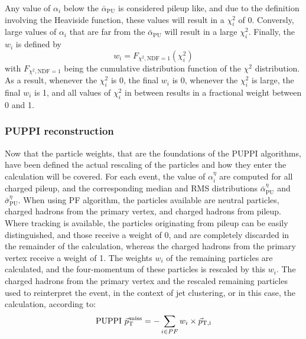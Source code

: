 Any value of $\alpha_i$ below the $\bar{\alpha}_{\text{PU}}$ is considered pileup like, and due to the definition involving the Heaviside function, these values will result in a $\chi_{i}^{2}$ of 0.  
Conversly, large values of $\alpha_i$ that are far from the $\bar{\alpha}_{\text{PU}}$ will result in a large $\chi_{i}^{2}$.
Finally, the $w_{i}$ is defined by
\begin{equation}
w_{i} = F_{\chi^{2}, \mathrm{NDF}=1}(\chi_{i}^{2})
\end{equation} 
with $ F_{\chi^{2}, \mathrm{NDF}=1}$ being the cumulative distribution function of the  $\chi^{2}$ distribution. 
As a result, whenever the $\chi_{i}^{2}$ is 0, the final $w_i$ is 0, whenever the $\chi_{i}^{2}$ is large, the final $w_i$ is 1, and all values of $\chi_{i}^{2}$ in between results in a fractional weight between 0 and 1. 
\subsubsection{PUPPI \ptmiss reconstruction}
Now that the particle weights, that are the foundations of the PUPPI algorithms, have been defined the actual rescaling of the particles and how they enter the \ptmiss calculation will be covered. 
For each event, the value of $\alpha_{i}^{\eta}$ are computed for all charged pileup, and the corresponding median and RMS distributions $\bar{\alpha}_{\text{PU}}^{\eta}$ and $\bar{\sigma}_{\text{PU}}^{\eta}$. 
When using PF algorithm, the particles available are neutral particles, charged hadrons from the primary vertex, and charged hadrons from pileup. 
Where tracking is available, the particles originating from pileup can be easily distinguished, and those receive a weight of 0, and are completely discarded in the remainder of the calculation, whereas the charged hadrons from the primary vertex receive a weight of 1. 
The weights $w_i$ of the remaining particles are calculated, and the four-momentum of these particles is rescaled by this $w_i$. 
The charged hadrons from the primary vertex and the rescaled remaining particles used to reinterpret the event, in the context of jet clustering, or in this case, the \ptmiss calculation, according to:
\begin{equation}
\mathrm{PUPPI}\,\, {\vec p}_{\mathrm{T}}^{\kern1pt\text{miss}} =- \sum_{i\in PF} w_i \times \vec{p}_{\mathrm{T, i}}             
\end{equation}   

